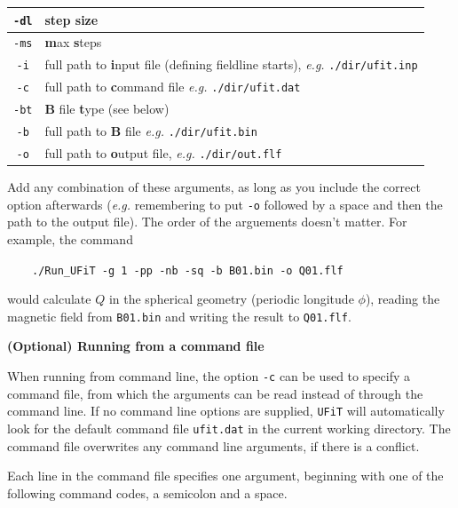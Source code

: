 \documentclass[12pt,twoside]{article}
\begin{document}
\begin{tabular}{|c|l|}
		\texttt{-dl} & step size \\\hline
		\texttt{-ms} & \textbf{m}ax \textbf{s}teps  \\\hline
		\texttt{-i} & full path to \textbf{i}nput file (defining fieldline starts), \textit{e.g.} \texttt{./dir/ufit.inp} \\\hline
		\texttt{-c} & full path to \textbf{c}ommand file \textit{e.g.} \texttt{./dir/ufit.dat} \\\hline
		\texttt{-bt} & $\mathbf{B}$ file \textbf{t}ype (see below) \\\hline
		\texttt{-b} & full path to $\mathbf{B}$ file \textit{e.g.} \texttt{./dir/ufit.bin} \\\hline
		\texttt{-o} & full path to \textbf{o}utput file, \textit{e.g.} \texttt{./dir/out.flf} \\\hline

\end{tabular}

\vspace{2mm}

Add any combination of these arguments, as long as you include the correct option afterwards (\textit{e.g.} remembering to put \texttt{-o} followed by a space and then the path to the output file). The order of the arguements doesn't matter. For example, the command

$\quad\quad$\texttt{./Run\_UFiT -g 1 -pp -nb -sq -b B01.bin -o Q01.flf}

would calculate $Q$ in the spherical geometry (periodic longitude $\phi$), reading the magnetic field from \texttt{B01.bin} and writing the result to \texttt{Q01.flf}.


\vspace{2mm}
{\Large \textbf{(Optional) Running from a command file}}

When running from command line, the option \texttt{-c} can be used to specify a command file, from which the arguments can be read instead of through the command line. If no command line options are supplied, \texttt{UFiT} will automatically look for the default command file \texttt{ufit.dat} in the current working directory. The command file overwrites any command line arguments, if there is a conflict.

Each line in the command file specifies one argument, beginning with one of the following command codes, a semicolon and a space.
\end{document}
